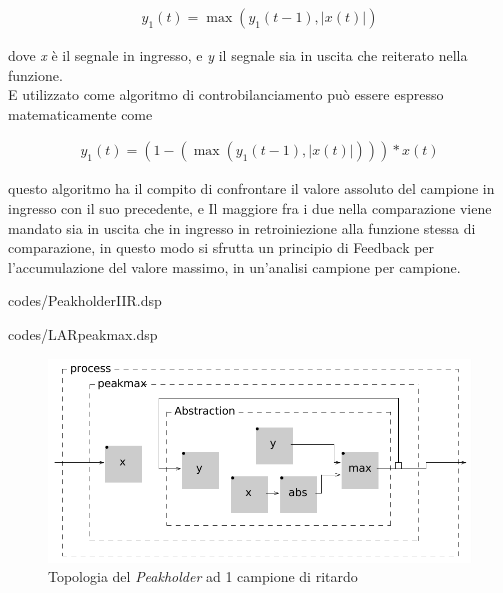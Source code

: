 \begin{align*} 
    y_{1}(t) = \max\left( y_{1}(t\!-\!1), \left\lvert{x(t)}\right\rvert \right) 
\end{align*}

dove \textit{x} è il segnale in ingresso, e \textit{y} il segnale sia in uscita che reiterato nella funzione. \\
E utilizzato come algoritmo di controbilanciamento può essere espresso matematicamente come

\begin{align*} 
    y_{1}(t) = (1-(\max\left( y_{1}(t\!-\!1), \left\lvert{x(t)}\right\rvert \right))) * x(t)
\end{align*}

questo algoritmo ha il compito di confrontare il valore assoluto del campione in ingresso con il suo precedente,
e Il maggiore fra i due nella comparazione viene mandato sia in uscita che in ingresso 
in retroiniezione alla funzione stessa di comparazione, 
in questo modo si sfrutta un principio di Feedback per l'accumulazione
del valore massimo, in un'analisi campione per campione.

\vspace{0.5cm} 

{codes/PeakholderIIR.dsp}

\vspace{0.5cm} 

{codes/LARpeakmax.dsp}

\begin{figure}[h!]
\begin{center}
    \includegraphics[width=14cm]{figures/PeakholderIIR.pdf}
    \caption{Topologia del \textit{Peakholder} ad 1 campione di ritardo} 
    \end{center}
\end{figure} 

